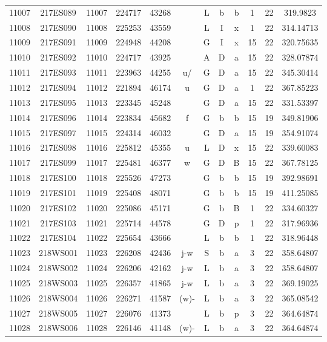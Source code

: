\begin{tabular}{|*{12}{c|}}
11007 & 217ES089 & 11007 & 224717 & 43268 &  & L & b & b & 1 & 22 & 319.9823 \\ 
11008 & 217ES090 & 11008 & 225253 & 43559 &  & L & I & x & 1 & 22 & 314.14713 \\ 
11009 & 217ES091 & 11009 & 224948 & 44208 &  & G & I & x & 15 & 22 & 320.75635 \\ 
11010 & 217ES092 & 11010 & 224717 & 43925 &  & A & D & a & 15 & 22 & 328.07874 \\ 
11011 & 217ES093 & 11011 & 223963 & 44255 & u/ & G & D & a & 15 & 22 & 345.30414 \\ 
11012 & 217ES094 & 11012 & 221894 & 46174 & u & G & D & a & 1 & 22 & 367.85223 \\ 
11013 & 217ES095 & 11013 & 223345 & 45248 &  & G & D & a & 15 & 22 & 331.53397 \\ 
11014 & 217ES096 & 11014 & 223834 & 45682 & f & G & b & b & 15 & 19 & 349.81906 \\ 
11015 & 217ES097 & 11015 & 224314 & 46032 &  & G & D & a & 15 & 19 & 354.91074 \\ 
11016 & 217ES098 & 11016 & 225812 & 45355 & u & L & D & x & 15 & 22 & 339.60083 \\ 
11017 & 217ES099 & 11017 & 225481 & 46377 & w & G & D & B & 15 & 22 & 367.78125 \\ 
11018 & 217ES100 & 11018 & 225526 & 47273 &  & G & b & b & 15 & 19 & 392.98691 \\ 
11019 & 217ES101 & 11019 & 225408 & 48071 &  & G & b & b & 15 & 19 & 411.25085 \\ 
11020 & 217ES102 & 11020 & 225086 & 45171 &  & G & b & B & 1 & 22 & 334.60327 \\ 
11021 & 217ES103 & 11021 & 225714 & 44578 &  & G & D & p & 1 & 22 & 317.96936 \\ 
11022 & 217ES104 & 11022 & 225654 & 43666 &  & L & b & b & 1 & 22 & 318.96448 \\ 
11023 & 218WS001 & 11023 & 226208 & 42436 & j-w & S & b & a & 3 & 22 & 358.64807 \\ 
11024 & 218WS002 & 11024 & 226206 & 42162 & j-w & L & b & a & 3 & 22 & 358.64807 \\ 
11025 & 218WS003 & 11025 & 226357 & 41865 & j-w & L & b & a & 3 & 22 & 369.19025 \\ 
11026 & 218WS004 & 11026 & 226271 & 41587 & (w)- & L & b & a & 3 & 22 & 365.08542 \\ 
11027 & 218WS005 & 11027 & 226076 & 41373 &  & L & b & p & 3 & 22 & 364.64874 \\ 
11028 & 218WS006 & 11028 & 226146 & 41148 & (w)- & L & b & a & 3 & 22 & 364.64874 \\ 

\end{tabular}
